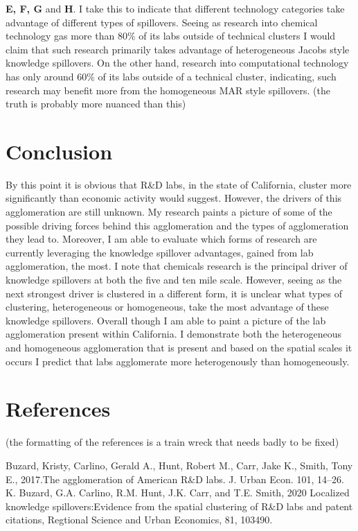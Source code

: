 \documentclass[12pt,letterpaper]{article}
\begin{document}
\textbf{E, F, G} and \textbf{H}. I take this to indicate that different technology categories take advantage of different types of spillovers. Seeing as research into chemical technology gas more than 80\% of its labs outside of technical clusters I would claim that such research primarily takes advantage of heterogeneous Jacobs style knowledge spillovers. On the other hand, research into computational technology has only around 60\% of its labs outside of a technical cluster, indicating, such research may benefit more from the homogeneous MAR style spillovers. {\color{blue}(the truth is probably more nuanced than this)}

\section{Conclusion}
By this point it is obvious that R\&D labs, in the state of California, cluster more significantly than economic activity would suggest. However, the drivers of this agglomeration are still unknown. My research paints a picture of some of the possible driving forces behind this agglomeration and the types of agglomeration they lead to. Moreover, I am able to evaluate which forms of research are currently leveraging the knowledge spillover advantages, gained from lab agglomeration, the most. I note that chemicals research is the principal driver of knowledge spillovers at both the five and ten mile scale. However, seeing as the next strongest driver is clustered in a different form, it is unclear what types of clustering, heterogeneous or homogeneous, take the most advantage of these knowledge spillovers. Overall though I am able to paint a picture of the lab agglomeration present within California. I demonstrate both the heterogeneous and homogeneous agglomeration that is present and based on the spatial scales it occurs I predict that labs agglomerate more heterogenously than homogeneously. 

\newpage
\section{References}    
{\color{red}(the formatting of the references is a train wreck that needs badly to be fixed)}
 
Buzard, Kristy, Carlino, Gerald A., Hunt, Robert M., Carr, Jake K., Smith, Tony E., 2017.The agglomeration of American R\&D labs. J. Urban Econ. 101, 14–26.\\
 
\noindent K. Buzard, G.A. Carlino, R.M. Hunt, J.K. Carr, and T.E. Smith, 2020 Localized knowledge spillovers:Evidence from the spatial clustering of R\&D labs and patent citations, Regtional Science and Urban Economics, 81, 103490.\\
 
\end{document}
